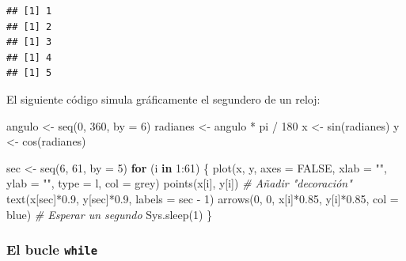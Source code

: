 \documentclass[
]{book}
\newenvironment{Shaded}{\begin{snugshade}}{\end{snugshade}}
\newcommand{\AttributeTok}[1]{\textcolor[rgb]{0.77,0.63,0.00}{#1}}
\newcommand{\CommentTok}[1]{\textcolor[rgb]{0.56,0.35,0.01}{\textit{#1}}}
\newcommand{\ConstantTok}[1]{\textcolor[rgb]{0.00,0.00,0.00}{#1}}
\newcommand{\ControlFlowTok}[1]{\textcolor[rgb]{0.13,0.29,0.53}{\textbf{#1}}}
\newcommand{\DecValTok}[1]{\textcolor[rgb]{0.00,0.00,0.81}{#1}}
\newcommand{\FloatTok}[1]{\textcolor[rgb]{0.00,0.00,0.81}{#1}}
\newcommand{\FunctionTok}[1]{\textcolor[rgb]{0.00,0.00,0.00}{#1}}
\newcommand{\NormalTok}[1]{#1}
\newcommand{\OtherTok}[1]{\textcolor[rgb]{0.56,0.35,0.01}{#1}}
\newcommand{\SpecialCharTok}[1]{\textcolor[rgb]{0.00,0.00,0.00}{#1}}
\newcommand{\StringTok}[1]{\textcolor[rgb]{0.31,0.60,0.02}{#1}}
\theoremstyle{break}
\theoremstyle{nonumberplain}
\begin{document}
\begin{verbatim}
## [1] 1
## [1] 2
## [1] 3
## [1] 4
## [1] 5
\end{verbatim}

El siguiente código simula gráficamente el segundero de un
reloj:

\begin{Shaded}
\begin{Highlighting}[]
\NormalTok{angulo }\OtherTok{\textless{}{-}} \FunctionTok{seq}\NormalTok{(}\DecValTok{0}\NormalTok{, }\DecValTok{360}\NormalTok{, }\AttributeTok{by =} \DecValTok{6}\NormalTok{)}
\NormalTok{radianes }\OtherTok{\textless{}{-}}\NormalTok{ angulo }\SpecialCharTok{*}\NormalTok{ pi }\SpecialCharTok{/} \DecValTok{180}
\NormalTok{x }\OtherTok{\textless{}{-}} \FunctionTok{sin}\NormalTok{(radianes)}
\NormalTok{y }\OtherTok{\textless{}{-}} \FunctionTok{cos}\NormalTok{(radianes)}

\NormalTok{sec }\OtherTok{\textless{}{-}} \FunctionTok{seq}\NormalTok{(}\DecValTok{6}\NormalTok{, }\DecValTok{61}\NormalTok{, }\AttributeTok{by =} \DecValTok{5}\NormalTok{)}
\ControlFlowTok{for}\NormalTok{ (i }\ControlFlowTok{in} \DecValTok{1}\SpecialCharTok{:}\DecValTok{61}\NormalTok{) \{}
  \FunctionTok{plot}\NormalTok{(x, y, }\AttributeTok{axes =} \ConstantTok{FALSE}\NormalTok{, }\AttributeTok{xlab =} \StringTok{""}\NormalTok{, }\AttributeTok{ylab =} \StringTok{""}\NormalTok{, }\AttributeTok{type =} \StringTok{\textquotesingle{}l\textquotesingle{}}\NormalTok{, }\AttributeTok{col =} \StringTok{\textquotesingle{}grey\textquotesingle{}}\NormalTok{)}
  \FunctionTok{points}\NormalTok{(x[i], y[i])}
  \CommentTok{\# Añadir "decoración"}
  \FunctionTok{text}\NormalTok{(x[sec]}\SpecialCharTok{*}\FloatTok{0.9}\NormalTok{, y[sec]}\SpecialCharTok{*}\FloatTok{0.9}\NormalTok{, }\AttributeTok{labels =}\NormalTok{ sec }\SpecialCharTok{{-}} \DecValTok{1}\NormalTok{)}
  \FunctionTok{arrows}\NormalTok{(}\DecValTok{0}\NormalTok{, }\DecValTok{0}\NormalTok{, x[i]}\SpecialCharTok{*}\FloatTok{0.85}\NormalTok{, y[i]}\SpecialCharTok{*}\FloatTok{0.85}\NormalTok{, }\AttributeTok{col =} \StringTok{\textquotesingle{}blue\textquotesingle{}}\NormalTok{)}
  \CommentTok{\# Esperar un segundo}
  \FunctionTok{Sys.sleep}\NormalTok{(}\DecValTok{1}\NormalTok{)}
\NormalTok{\}}
\end{Highlighting}
\end{Shaded}

\hypertarget{el-bucle-while}{%
\subsubsection{\texorpdfstring{El bucle \texttt{while}}{El bucle while}}\label{el-bucle-while}}
\end{document}
